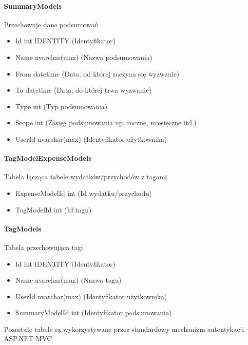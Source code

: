 \documentclass[10pt,titlepage]{article}
\begin{document}
\paragraph[short]{SummaryModels}
Przechowuje dane podsumowań
\begin{itemize}
  \item Id int IDENTITY (Identyfikator)
  \item Name nvarchar(max) (Nazwa podsumowania)
  \item From datetime (Data, od której zaczyna się wyzwanie)
  \item To datetime (Data, do której trwa wyzwanie)
  \item Type int (Typ podsumowania)
  \item Scope int (Zasięg podsumowania np. roczne, miesięczne itd.)
  \item UserId nvarchar(max) (Identyfikator użytkownika)
\end{itemize}
\paragraph[short]{TagModelExpenseModels}
Tabela łącząca tabele wydatków/przychodów z tagami
\begin{itemize}
  \item ExpenseModelId int (Id wydatku/przychodu)
  \item TagModelId int (Id tagu)
\end{itemize}
\paragraph[short]{TagModels}
Tabela przechowująca tagi
\begin{itemize}
  \item Id int IDENTITY (Identyfikator)
  \item Name nvarchar(max) (Nazwa tagu)
  \item UserId nvarchar(max) (Identyfikator użytkownika)
  \item SummaryModelId int (Identyfikator podsumowania)
\end{itemize}
Pozostałe tabele są wykorzystywane przez standardowy mechanizm autentykacji ASP.NET MVC.


%

%
\end{document}
